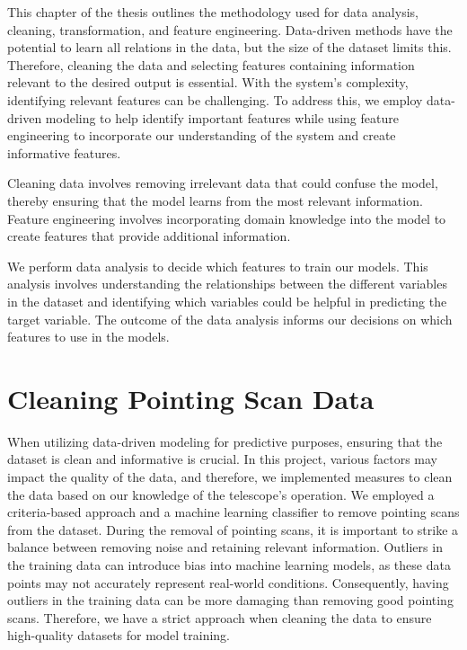 
This chapter of the thesis outlines the methodology used for data analysis, cleaning, transformation, and feature engineering.
Data-driven methods have the potential to learn all relations in the data, but the size of the dataset limits this.
Therefore, cleaning the data and selecting features containing information relevant to the desired output is essential.
With the system's complexity, identifying relevant features can be challenging.
To address this, we employ data-driven modeling to help identify important features while using feature engineering to incorporate
our understanding of the system and create informative features.

Cleaning data involves removing irrelevant data that could confuse the model, thereby ensuring that the model learns from the most relevant information.
Feature engineering involves incorporating domain knowledge into the model to create features that provide additional information.

We perform data analysis to decide which features to train our models.
This analysis involves understanding the relationships between the different variables in the dataset and identifying which variables
could be helpful in predicting the target variable.
The outcome of the data analysis informs our decisions on which features to use in the models.


\section{Cleaning Pointing Scan Data} \label{sec:cleaning_pt_scan}

When utilizing data-driven modeling for predictive purposes, ensuring that the dataset is clean and informative is crucial.
In this project, various factors may impact the quality of the data, and therefore, we implemented measures to clean the data based on our knowledge of the telescope's operation.
We employed a criteria-based approach and a machine learning classifier to remove pointing scans from the dataset.
During the removal of pointing scans, it is important to strike a balance between removing noise and retaining relevant information.
Outliers in the training data can introduce bias into machine learning models, as these data points may not accurately represent real-world conditions.
Consequently, having outliers in the training data can be more damaging than removing good pointing scans.
Therefore, we have a strict approach when cleaning the data to ensure high-quality datasets for model training.


